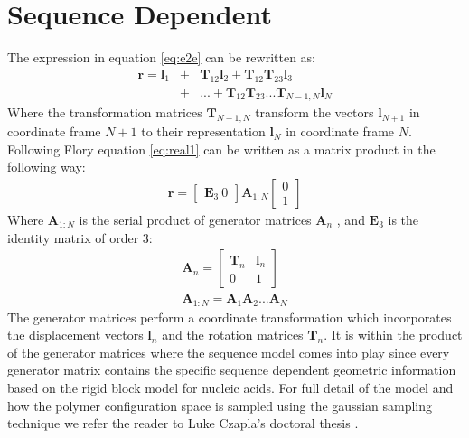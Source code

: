 \section{Sequence Dependent}
The expression in equation \ref{eq:e2e} can be rewritten as:
\begin{eqnarray}
\label{eq:real1}  
\textbf{r} = \textbf{l}_{1} & + & \textbf{T}_{12}\textbf{l}_{2}
+\textbf{T}_{12}\textbf{T}_{23}\textbf{l}_{3} \nonumber \\
 & + & ... + \textbf{T}_{12}\textbf{T}_{23}...\textbf{T}_{N-1,N} \textbf{l}_{N}
\end{eqnarray}
Where the transformation matrices $\textbf{T}_{N-1,N}$ transform the
vectors $\textbf{l}_{N+1}$ in coordinate frame $N+1$ to their
representation $\textbf{l}_{N}$ in coordinate frame $N$.
Following Flory \cite{flory1969} equation \ref{eq:real1} can be
written as a matrix product in the following way:
\begin{gather}
\textbf{r}= \begin{bmatrix}\textbf{E}_{3}~ 0 \end{bmatrix} \textbf{A}_{1:N}\begin{bmatrix} 0 \\ 1 \end{bmatrix}
\end{gather}
Where $\textbf{A}_{1:N}$ is the serial product of generator matrices
$\textbf{A}_{n}$ \cite{marky1994a}, and $\textbf{E}_{3}$ is the
identity matrix of order 3:
\begin{gather}
\textbf{A}_{n} =
\begin{bmatrix}
\textbf{T}_{n} & \textbf{l}_{n} \\
0 & 1
\end{bmatrix}\\
\textbf{A}_{1:N}=\textbf{A}_{1}\textbf{A}_{2}...\textbf{A}_{N}
\end{gather}
The  generator  matrices  perform  a coordinate  transformation  which
incorporates  the   displacement  vectors  $\textbf{l}_{n}$   and  the
rotation matrices  $\textbf{T}_{n}$. It is  within the product  of the
generator  matrices where  the sequence  model comes  into  play since
every  generator  matrix  contains  the  specific  sequence  dependent
geometric  information based  on  the rigid  block  model for  nucleic
acids.  For full detail of the model and how the polymer configuration
space is  sampled using the  gaussian sampling technique we  refer the
reader to Luke Czapla's doctoral thesis \cite{czapla2009}.




